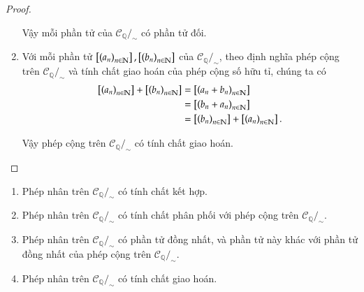 \begin{proof}
\begin{enumerate}[label={(\roman*)}]
              Vậy mỗi phần tử của $\mathscr{C}_{\mathbb{Q}}/_{\sim}$ có phần tử đối.
        \item Với mỗi phần tử $\left[{\left({a_{n}}\right)}_{{n}\in\mathbb{N}}\right], \left[{\left({b_{n}}\right)}_{{n}\in\mathbb{N}}\right]$ của $\mathscr{C}_{\mathbb{Q}}/_{\sim}$, theo định nghĩa phép cộng trên $\mathscr{C}_{\mathbb{Q}}/_{\sim}$ và tính chất giao hoán của phép cộng số hữu tỉ, chúng ta có
              \begin{align*}
                  \left[{\left({a_{n}}\right)}_{{n}\in\mathbb{N}}\right] + \left[{\left({b_{n}}\right)}_{{n}\in\mathbb{N}}\right] & = \left[{\left({a_{n} + b_{n}}\right)}_{{n}\in\mathbb{N}}\right]              \\
                                                        & = \left[{\left({b_{n} + a_{n}}\right)}_{{n}\in\mathbb{N}}\right]              \\
                                                        & = \left[{\left({b_{n}}\right)}_{{n}\in\mathbb{N}}\right] + \left[{\left({a_{n}}\right)}_{{n}\in\mathbb{N}}\right].
              \end{align*}

              Vậy phép cộng trên $\mathscr{C}_{\mathbb{Q}}/_{\sim}$ có tính chất giao hoán.
    \end{enumerate}
\end{proof}

\begin{theorem}\label{theorem:rational-cauchy-sequences-abelian-group}
    \begin{enumerate}[label={(\roman*)}]
        \item Phép nhân trên $\mathscr{C}_{\mathbb{Q}}/_{\sim}$ có tính chất kết hợp.
        \item Phép nhân trên $\mathscr{C}_{\mathbb{Q}}/_{\sim}$ có tính chất phân phối với phép cộng trên $\mathscr{C}_{\mathbb{Q}}/_{\sim}$.
        \item Phép nhân trên $\mathscr{C}_{\mathbb{Q}}/_{\sim}$ có phần tử đồng nhất, và phần tử này khác với phần tử đồng nhất của phép cộng trên $\mathscr{C}_{\mathbb{Q}}/_{\sim}$.
        \item Phép nhân trên $\mathscr{C}_{\mathbb{Q}}/_{\sim}$ có tính chất giao hoán.
    \end{enumerate}
\end{theorem}


